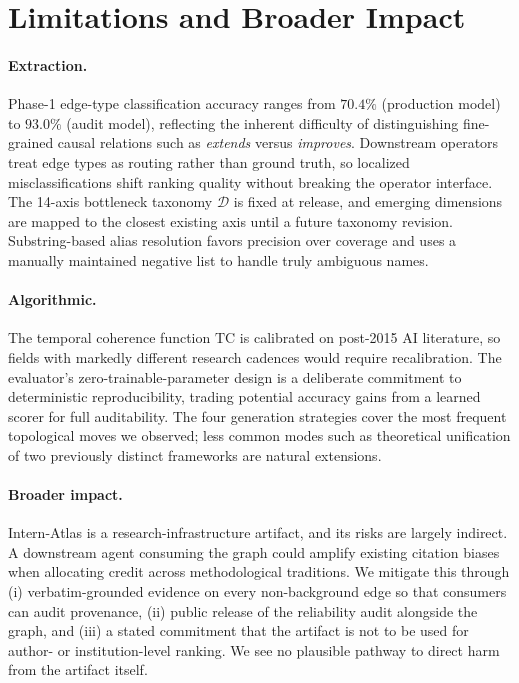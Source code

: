 \documentclass{llmxive}
\begin{document}
\section{Limitations and Broader Impact}
\label{app:limitations}

\paragraph{Extraction.}
Phase-1 edge-type classification accuracy ranges from $70.4\%$ (production model) to $93.0\%$ (audit model), reflecting the inherent difficulty of distinguishing fine-grained causal relations such as \emph{extends} versus \emph{improves}. Downstream operators treat edge types as routing rather than ground truth, so localized misclassifications shift ranking quality without breaking the operator interface. The 14-axis bottleneck taxonomy $\mathcal{D}$ is fixed at release, and emerging dimensions are mapped to the closest existing axis until a future taxonomy revision. Substring-based alias resolution favors precision over coverage and uses a manually maintained negative list to handle truly ambiguous names.

\paragraph{Algorithmic.}
The temporal coherence function $\mathrm{TC}$ is calibrated on post-2015 AI literature, so fields with markedly different research cadences would require recalibration. The evaluator's zero-trainable-parameter design is a deliberate commitment to deterministic reproducibility, trading potential accuracy gains from a learned scorer for full auditability. The four generation strategies cover the most frequent topological moves we observed; less common modes such as theoretical unification of two previously distinct frameworks are natural extensions.

\paragraph{Broader impact.}
Intern-Atlas is a research-infrastructure artifact, and its risks are largely indirect. A downstream agent consuming the graph could amplify existing citation biases when allocating credit across methodological traditions. We mitigate this through (i) verbatim-grounded evidence on every non-background edge so that consumers can audit provenance, (ii) public release of the reliability audit alongside the graph, and (iii) a stated commitment that the artifact is not to be used for author- or institution-level ranking. We see no plausible pathway to direct harm from the artifact itself.
\end{document}
